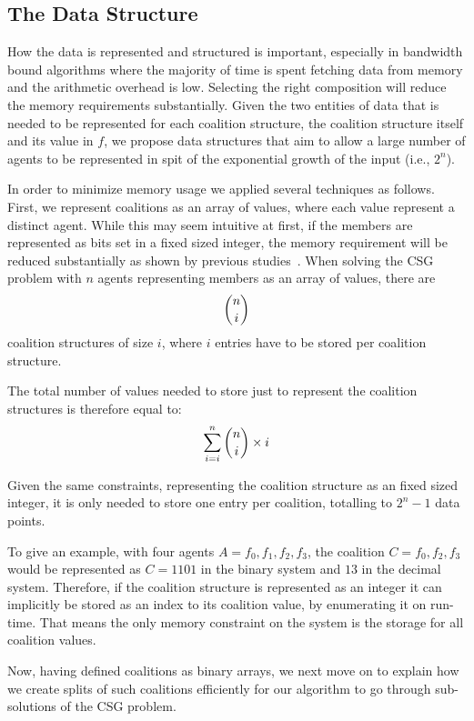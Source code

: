 \documentclass{llncs}
\begin{document}
\subsection{The Data Structure}\label{sec:data}
How the data is represented and structured is important,  especially in bandwidth bound algorithms where the majority of time is spent fetching data from memory and the arithmetic overhead is low.
Selecting the right composition will reduce the memory requirements substantially. Given the two entities of data that is needed to be represented for each coalition structure,  the coalition structure itself and its value in $f$, we propose data structures that aim to allow a large number of agents to be represented in spit of the exponential growth of the input (i.e., $2^n$).

In order to minimize memory usage we applied several  techniques as follows. First, we represent  coalitions as an array of values, where each value represent a distinct agent. While this may seem intuitive at first, if the members are represented as bits set in a fixed sized integer, the memory
requirement will be reduced substantially as shown by previous studies~\cite{boyer2012solving}.
When solving the CSG problem with $n$ agents representing members as an array of values, there are \[\dbinom{n}{i}\] coalition structures of size $i$, where $i$ entries have to be stored per coalition structure.

The total number of values needed to store just to represent the coalition structures is therefore equal to:
\begin{displaymath}\sum_{i=i}^{n} \dbinom{n}{i}\times i\end{displaymath}

Given the same constraints, representing the coalition structure as an fixed sized integer, it is only 
needed to store one entry per coalition, totalling to \begin{math}2^n-1\end{math} data points.

To give an example, with four agents $A = {f_0,f_1,f_2,f_3}$, the coalition $C = {f_0,f_2,f_3}$ would be represented as $C = 1101$ in the binary system and $13$ in the decimal system. Therefore, if the coalition structure is represented as an integer it can implicitly be stored as an index  to its coalition value, by enumerating it on run-time. That means the only memory constraint on the system is the storage for all  coalition values.

Now, having defined coalitions as binary arrays, we next move on to explain how we create splits of such coalitions efficiently for our algorithm to go through sub-solutions of the CSG problem.
\end{document}
